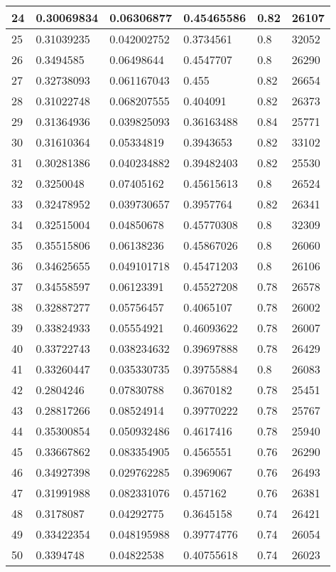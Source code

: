 \begin{longtable}{|l|l|l|l|l|l|}
24 & 0.30069834 & 0.06306877 & 0.45465586 & 0.82 & 26107 \\ \hline 
25 & 0.31039235 & 0.042002752 & 0.3734561 & 0.8 & 32052 \\ \hline 
26 & 0.3494585 & 0.06498644 & 0.4547707 & 0.8 & 26290 \\ \hline 
27 & 0.32738093 & 0.061167043 & 0.455 & 0.82 & 26654 \\ \hline 
28 & 0.31022748 & 0.068207555 & 0.404091 & 0.82 & 26373 \\ \hline 
29 & 0.31364936 & 0.039825093 & 0.36163488 & 0.84 & 25771 \\ \hline 
30 & 0.31610364 & 0.05334819 & 0.3943653 & 0.82 & 33102 \\ \hline 
31 & 0.30281386 & 0.040234882 & 0.39482403 & 0.82 & 25530 \\ \hline 
32 & 0.3250048 & 0.07405162 & 0.45615613 & 0.8 & 26524 \\ \hline 
33 & 0.32478952 & 0.039730657 & 0.3957764 & 0.82 & 26341 \\ \hline 
34 & 0.32515004 & 0.04850678 & 0.45770308 & 0.8 & 32309 \\ \hline 
35 & 0.35515806 & 0.06138236 & 0.45867026 & 0.8 & 26060 \\ \hline 
36 & 0.34625655 & 0.049101718 & 0.45471203 & 0.8 & 26106 \\ \hline 
37 & 0.34558597 & 0.06123391 & 0.45527208 & 0.78 & 26578 \\ \hline 
38 & 0.32887277 & 0.05756457 & 0.4065107 & 0.78 & 26002 \\ \hline 
39 & 0.33824933 & 0.05554921 & 0.46093622 & 0.78 & 26007 \\ \hline 
40 & 0.33722743 & 0.038234632 & 0.39697888 & 0.78 & 26429 \\ \hline 
41 & 0.33260447 & 0.035330735 & 0.39755884 & 0.8 & 26083 \\ \hline 
42 & 0.2804246 & 0.07830788 & 0.3670182 & 0.78 & 25451 \\ \hline 
43 & 0.28817266 & 0.08524914 & 0.39770222 & 0.78 & 25767 \\ \hline 
44 & 0.35300854 & 0.050932486 & 0.4617416 & 0.78 & 25940 \\ \hline 
45 & 0.33667862 & 0.083354905 & 0.4565551 & 0.76 & 26290 \\ \hline 
46 & 0.34927398 & 0.029762285 & 0.3969067 & 0.76 & 26493 \\ \hline 
47 & 0.31991988 & 0.082331076 & 0.457162 & 0.76 & 26381 \\ \hline 
48 & 0.3178087 & 0.04292775 & 0.3645158 & 0.74 & 26421 \\ \hline 
49 & 0.33422354 & 0.048195988 & 0.39774776 & 0.74 & 26054 \\ \hline 
50 & 0.3394748 & 0.04822538 & 0.40755618 & 0.74 & 26023 \\ \hline 
\end{longtable}
